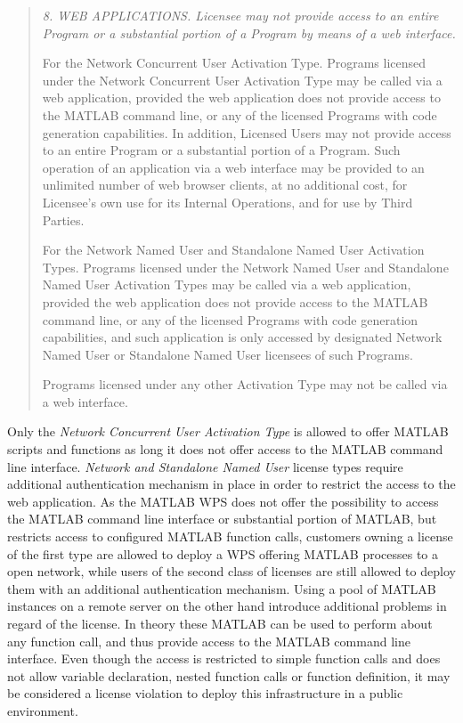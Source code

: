 		\begin{quote}\itshape\small
			8. WEB APPLICATIONS.  Licensee may not provide access to an entire Program or a substantial portion of a Program by means of a web interface.

			For the Network Concurrent User Activation Type.  Programs licensed under the Network Concurrent User Activation Type may be called via a web application, provided the web application does not provide access to the MATLAB command line, or any of the licensed Programs with code generation capabilities.  In addition, Licensed Users may not provide access to an entire Program or a substantial portion of a Program.  Such operation of an application via a web interface may be provided to an unlimited number of web browser clients, at no additional cost, for Licensee's own use for its Internal Operations, and for use by Third Parties.

			For the Network Named User and Standalone Named User Activation Types. Programs licensed under the Network Named User and Standalone Named User Activation Types may be called via a web application, provided the web application does not provide access to the MATLAB command line, or any of the licensed Programs with code generation capabilities, and such application is only accessed by designated Network Named User or Standalone Named User licensees of such Programs.

			Programs licensed under any other Activation Type may not be called via a web interface.
		\end{quote}

		Only the \emph{Network Concurrent User Activation Type} is allowed to offer MATLAB scripts and functions as long it does not offer access to the MATLAB command line interface. \emph{Network and Standalone Named User} license types require additional authentication mechanism in place in order to restrict the access to the web application. As the MATLAB WPS does not offer the possibility to access the MATLAB command line interface or substantial portion of MATLAB, but restricts access to configured MATLAB function calls, customers owning a license of the first type are allowed to deploy a \ac{WPS} offering MATLAB processes to a open network, while users of the second class of licenses are still allowed to deploy them with an additional authentication mechanism. Using a pool of MATLAB instances on a remote server on the other hand introduce additional problems in regard of the license. In theory these MATLAB can be used to perform about any function call, and thus provide access to the MATLAB command line interface. Even though the access is restricted to simple function calls and does not allow variable declaration, nested function calls or function definition, it may be considered a license violation to deploy this infrastructure in a public environment.

